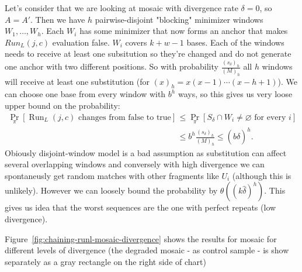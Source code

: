 Let's consider that we are looking at mosaic with divergence rate $\delta = 0$, so $A = A'$. Then we have $h$ pairwise-disjoint "blocking" minimizer windows $W_1, \ldots, W_h$. Each $W_i$ has some minimizer that now forms an anchor that makes $Run_L(j,c)$ evaluation false. $W_i$ covers $k+w-1$ bases. Each of the windows needs to receive at least one subsitution 
so they're changed and do not generate one anchor with two different positions.
So with probability $\frac{(s_{\delta})_h}{(M)_h}$ all $h$ windows will receive at least one substitution (for $(x)_h = x(x-1)\cdots(x-h+1)$).
We can choose one base from every window with $b^h$ ways, so this gives us very loose upper bound on the probability:
\[
\begin{aligned}
  \Pr_{\pi}\!\left[
    \operatorname{Run}_L(j,c)\text{ changes from false to true}
  \right]
  &\leq
  \Pr_{\pi}\!\left[
    S_{\delta}\cap W_i\neq\varnothing
    \text{ for every }i
  \right] \\
  &\leq
  b^h\frac{(s_{\delta})_h}{(M)_h}
  \leq
  (b\widehat{\delta})^h .
\end{aligned}
\]
Obiously disjoint-window model is a bad assumption as substitution can affect several overlapping windows and conversely with high divergence we can spontaneusly get random matches with other fragments like $U_i$ (although this is unlikely).
However we can loosely bound the probability by $\theta((k\widehat{\delta})^h)$. This gives us idea that the worst sequences are the one with perfect repeats (low divergence).

Figure~\ref{fig:chaining-runl-mosaic-divergence} shows the results for mosaic for different levels of divergence (the degraded mosaic - as control sample - is show separately as a gray rectangle on the right side of chart)

